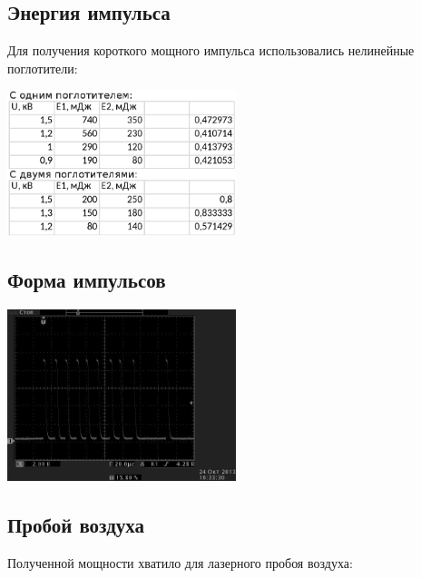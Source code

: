 \documentclass[twocolumn]{article}
\begin{document}
\subsection{Энергия импульса}Для получения короткого мощного импульса использовались нелинейные
поглотители:

 
    \begin{center}
    \includegraphics[width=0.5\textwidth]{LEMPH Report_files/LEMPH Report_35_0.png}
    \par
    \end{center}
    

\newpage
    
\subsection{Форма импульсов}

    
       
    \begin{center}
    \includegraphics[width=0.5\textwidth]{LEMPH Report_files/LEMPH Report_37_0.jpeg}
    \par
    \end{center}
    
          \newpage  
        
    
\subsection{Пробой воздуха}Полученной мощности хватило для лазерного пробоя воздуха:

\end{document}
